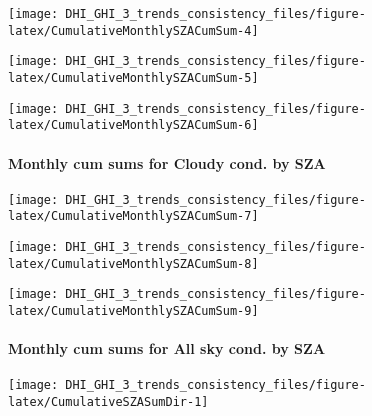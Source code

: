 \documentclass[
  10pt,
  a4paper,oneside]{article}
\begin{document}
\begin{center}\texttt{[image: DHI\_GHI\_3\_trends\_consistency\_files/figure-latex/CumulativeMonthlySZACumSum-4]} \end{center}

\begin{center}\texttt{[image: DHI\_GHI\_3\_trends\_consistency\_files/figure-latex/CumulativeMonthlySZACumSum-5]} \end{center}

\begin{center}\texttt{[image: DHI\_GHI\_3\_trends\_consistency\_files/figure-latex/CumulativeMonthlySZACumSum-6]} \end{center}

\newpage

\FloatBarrier

\hypertarget{monthly-cum-sums-for-cloudy-cond.-by-sza}{%
\paragraph{Monthly cum sums for Cloudy cond. by SZA}\label{monthly-cum-sums-for-cloudy-cond.-by-sza}}

\begin{center}\texttt{[image: DHI\_GHI\_3\_trends\_consistency\_files/figure-latex/CumulativeMonthlySZACumSum-7]} \end{center}

\begin{center}\texttt{[image: DHI\_GHI\_3\_trends\_consistency\_files/figure-latex/CumulativeMonthlySZACumSum-8]} \end{center}

\begin{center}\texttt{[image: DHI\_GHI\_3\_trends\_consistency\_files/figure-latex/CumulativeMonthlySZACumSum-9]} \end{center}

\newpage

\FloatBarrier

\hypertarget{monthly-cum-sums-for-all-sky-cond.-by-sza-1}{%
\paragraph{Monthly cum sums for All sky cond. by SZA}\label{monthly-cum-sums-for-all-sky-cond.-by-sza-1}}

\begin{center}\texttt{[image: DHI\_GHI\_3\_trends\_consistency\_files/figure-latex/CumulativeSZASumDir-1]} \end{center}
\end{document}
